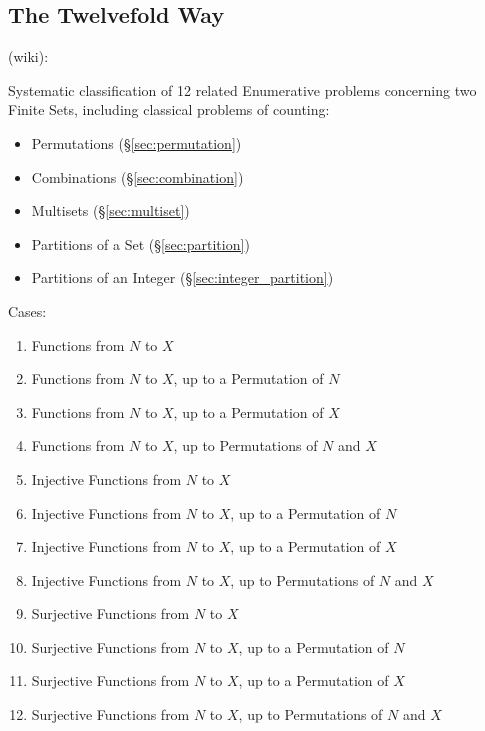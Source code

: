 \subsection{The Twelvefold Way}\label{sec:twelvefold_way}

(wiki):

Systematic classification of 12 related Enumerative problems concerning two
Finite Sets, including classical problems of counting:
\begin{itemize}
  \item Permutations (\S\ref{sec:permutation})
  \item Combinations (\S\ref{sec:combination})
  \item Multisets (\S\ref{sec:multiset})
  \item Partitions of a Set (\S\ref{sec:partition})
  \item Partitions of an Integer (\S\ref{sec:integer_partition})
\end{itemize}

Cases:
\begin{enumerate}
  \item Functions from $N$ to $X$
  \item Functions from $N$ to $X$, up to a Permutation of $N$
  \item Functions from $N$ to $X$, up to a Permutation of $X$
  \item Functions from $N$ to $X$, up to Permutations of $N$ and $X$
  \item Injective Functions from $N$ to $X$
  \item Injective Functions from $N$ to $X$, up to a Permutation of $N$
  \item Injective Functions from $N$ to $X$, up to a Permutation of $X$
  \item Injective Functions from $N$ to $X$, up to Permutations of $N$ and $X$
  \item Surjective Functions from $N$ to $X$
  \item Surjective Functions from $N$ to $X$, up to a Permutation of $N$
  \item Surjective Functions from $N$ to $X$, up to a Permutation of $X$
  \item Surjective Functions from $N$ to $X$, up to Permutations of $N$ and $X$
\end{enumerate}



